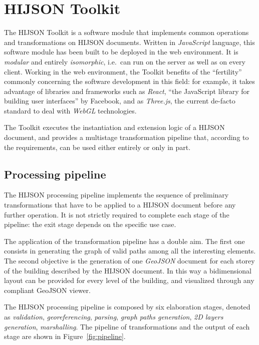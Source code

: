 
\section{HIJSON Toolkit}\label{hijson-toolkit}

The HIJSON Toolkit is a software module that implements common
operations and transformations on HIJSON documents. Written in
\emph{JavaScript} language, this software module has been built to be deployed in the web
environment. It is \emph{modular} and entirely \emph{isomorphic},
i.e.~can run on the server as well as on every client. Working in the
web environment, the Toolkit benefits of the ``fertility'' commonly concerning the
software development in this field: for example, it takes advantage of libraries and
frameworks such as \emph{React}, ``the JavaScript library for building
user interfaces'' by Facebook, and as \emph{Three.js}, the current de-facto standard to deal
with \emph{WebGL} technologies.

The Toolkit executes the instantiation and extension logic of a HIJSON
document, and provides a multistage transformation pipeline that, according to the requirements,
can be used either entirely or only in part.

\subsection{Processing pipeline}\label{hijson-processing-pipeline}

The HIJSON processing pipeline implements the sequence of preliminary
transformations that have to be applied to a HIJSON document before any
further operation. It is not strictly required to complete each stage of
the pipeline: the exit stage depends on the specific use case.

The application of the transformation pipeline has a double aim. The first one
consists in generating the graph of valid paths among all the interesting
elements. The second objective is the generation of one \emph{GeoJSON}
document for each storey of the building described by the HIJSON document. In
this way a bidimensional layout  can be provided for every level of the building, 
and visualized through any compliant GeoJSON viewer.

The HIJSON processing pipeline is composed by six elaboration stages, denoted
as \emph{validation}, \emph{georeferencing}, \emph{parsing}, \emph{graph paths
generation}, \emph{2D layers generation}, \emph{marshalling}. The pipeline of
transformations and the output of each stage are shown in
Figure~\ref{fig:pipeline}.

